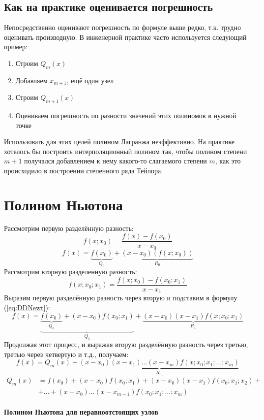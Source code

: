 \documentclass[a4paper,11pt]{article}
\begin{document}
\newpage
  \subsection{Как на практике оценивается погрешность}
  Непосредственно оценивают погрешность по формуле выше редко, т.к. трудно оценивать производную. В инженерной практике часто используется следующий пример:
  \begin{enumerate}
    \item Строим $Q_m(x)$
    \item Добавляем $x_{m+1}$, ещё один узел
    \item Строим $Q_{m+1}(x)$
    \item Оцениваем погрешность по разности значений этих полиномов в нужной точке
  \end{enumerate}
  Использовать для этих целей полином Лагранжа неэффективно. На практике хотелось бы построить интерполяционный полином так, чтобы полином степени $m+1$
  получался добавлением к нему какого-то слагаемого степени $m$, как это происходило в построении степенного ряда Тейлора.

\section{Полином Ньютона}
Рассмотрим первую разделённую разность:
\[f(x; x_0) = \frac{f(x) - f(x_0)}{x - x_0}\]
\begin{equation}
  f(x) = \underbrace{f(x_0)}_{Q_0} + \underbrace{(x - x_0)(f(x; x_0))}_{R_0}
  \label{eq:DDNewt}
\end{equation}
Рассмотрим вторную разделенную разность:
\[f(x; x_0; x_1) = \frac{f(x; x_0) - f(x_0; x_1)}{x - x_1}\]
Выразим первую разделённую разность через вторую и подставим в формулу (\ref{eq:DDNewt}):
\[f(x) = \underbrace{\underbrace{f(x_0)}_{Q_0} + (x - x_0)f(x_0; x_1)}_{Q_1} + \underbrace{(x - x_0)(x - x_1)f(x; x_0; x_1)}_{R_1}\]
Продолжая этот процесс, и выражая вторую разделённую разность через третью, третью через четвертую и т.д., получаем:
\[f(x) = Q_m(x) + \underbrace{(x - x_0)(x - x_1)\dots(x - x_m)f(x; x_0; x_1; \dots; x_m)}_{R_m}\]
\vspace{10mm}
\begin{equation}
  \begin{aligned}
    Q_m(x) &= f(x_0) + (x - x_0)f(x_0; x_1)+(x - x_0)(x - x_1)f(x_0; x_1; x_2) +\\
          & + \dots + (x - x_0)\dots(x - x_{m-1})f(x_0; x_1; \dots; x_m) \\
  \end{aligned}
  \label{eq:GenNewtPol}
\end{equation}
\begin{center}
  \textbf{Полином Ньютона для неравноотстоящих узлов}
\end{center}
\end{document}
